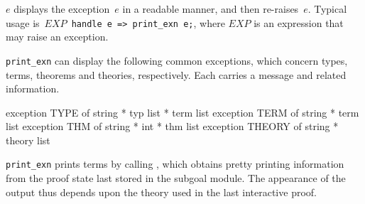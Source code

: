 \begin{ttdescription}
\item[\ttindexbold{print_exn} $e$] 
displays the exception~$e$ in a readable manner, and then re-raises~$e$.
Typical usage is~\hbox{\tt $EXP$ handle e => print_exn e;}, where
$EXP$ is an expression that may raise an exception.

{\tt print_exn} can display the following common exceptions, which concern
types, terms, theorems and theories, respectively.  Each carries a message
and related information.
\begin{ttbox} 
exception TYPE   of string * typ list * term list
exception TERM   of string * term list
exception THM    of string * int * thm list
exception THEORY of string * theory list
\end{ttbox}
\end{ttdescription}
\begin{warn}
  {\tt print_exn} prints terms by calling , which obtains
  pretty printing information from the proof state last stored in the
  subgoal module.  The appearance of the output thus depends upon the
  theory used in the last interactive proof.
\end{warn}



